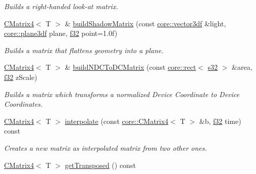 \begin{DoxyCompactItemize}
\begin{DoxyCompactList}\small\item\em Builds a right-\/handed look-\/at matrix. \end{DoxyCompactList}\item 
\hyperlink{classirr_1_1core_1_1CMatrix4}{C\+Matrix4}$<$ T $>$ \& \hyperlink{classirr_1_1core_1_1CMatrix4_a583d0ece1d80f69101660e1cbe441768}{build\+Shadow\+Matrix} (const \hyperlink{namespaceirr_1_1core_a06f169d08b5c429f5575acb7edbad811}{core\+::vector3df} \&light, \hyperlink{namespaceirr_1_1core_ae7491b7985dcb74b840bfcd9c054b232}{core\+::plane3df} plane, \hyperlink{namespaceirr_a0277be98d67dc26ff93b1a6a1d086b07}{f32} point=1.\+0f)
\begin{DoxyCompactList}\small\item\em Builds a matrix that flattens geometry into a plane. \end{DoxyCompactList}\item 
\hyperlink{classirr_1_1core_1_1CMatrix4}{C\+Matrix4}$<$ T $>$ \& \hyperlink{classirr_1_1core_1_1CMatrix4_a88a7d2f56d4ce637823379de308f673a}{build\+N\+D\+C\+To\+D\+C\+Matrix} (const \hyperlink{classirr_1_1core_1_1rect}{core\+::rect}$<$ \hyperlink{namespaceirr_ac66849b7a6ed16e30ebede579f9b47c6}{s32} $>$ \&area, \hyperlink{namespaceirr_a0277be98d67dc26ff93b1a6a1d086b07}{f32} z\+Scale)
\begin{DoxyCompactList}\small\item\em Builds a matrix which transforms a normalized Device Coordinate to Device Coordinates. \end{DoxyCompactList}\item 
\hyperlink{classirr_1_1core_1_1CMatrix4}{C\+Matrix4}$<$ T $>$ \hyperlink{classirr_1_1core_1_1CMatrix4_a0c9ed4a87ab8a1340e075490cd9de309}{interpolate} (const \hyperlink{classirr_1_1core_1_1CMatrix4}{core\+::\+C\+Matrix4}$<$ T $>$ \&b, \hyperlink{namespaceirr_a0277be98d67dc26ff93b1a6a1d086b07}{f32} time) const 
\begin{DoxyCompactList}\small\item\em Creates a new matrix as interpolated matrix from two other ones. \end{DoxyCompactList}\item 
\hyperlink{classirr_1_1core_1_1CMatrix4}{C\+Matrix4}$<$ T $>$ \hyperlink{classirr_1_1core_1_1CMatrix4_a83e8a629180ab12262d2e2cf52c7991b}{get\+Transposed} () const \hypertarget{classirr_1_1core_1_1CMatrix4_a83e8a629180ab12262d2e2cf52c7991b}{}\label{classirr_1_1core_1_1CMatrix4_a83e8a629180ab12262d2e2cf52c7991b}


\end{DoxyCompactItemize}
